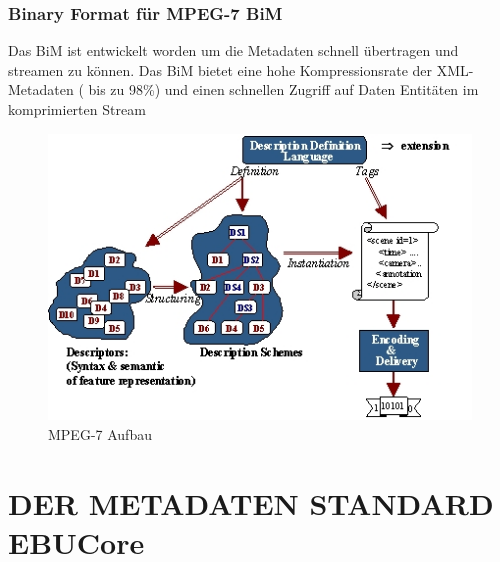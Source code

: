 \subsubsection{Binary Format für MPEG-7 BiM}

Das BiM ist entwickelt worden um die Metadaten schnell übertragen und streamen zu können. Das BiM bietet eine hohe Kompressionsrate der XML-Metadaten ( bis zu 98\%) und einen schnellen Zugriff auf Daten Entitäten im komprimierten Stream
\begin{figure}[h]
\includegraphics [scale=0.55]{image004.jpg}
\caption {MPEG-7 Aufbau}
\end{figure}


	\newpage
	\section{DER METADATEN STANDARD EBUCore}
	
